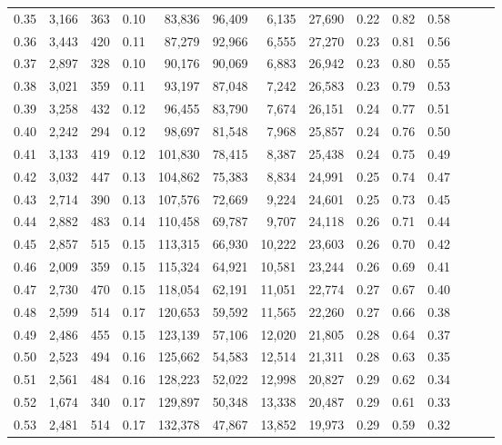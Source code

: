 \begin{tabular}{rrrrrrrrrrrrrr}
0.35 &  3,166 &    363 &  0.10 &   83,836 &   96,409 &   6,135 &  27,690 &  0.22 &  0.82 &      0.58 \\
0.36 &  3,443 &    420 &  0.11 &   87,279 &   92,966 &   6,555 &  27,270 &  0.23 &  0.81 &      0.56 \\
0.37 &  2,897 &    328 &  0.10 &   90,176 &   90,069 &   6,883 &  26,942 &  0.23 &  0.80 &      0.55 \\
0.38 &  3,021 &    359 &  0.11 &   93,197 &   87,048 &   7,242 &  26,583 &  0.23 &  0.79 &      0.53 \\
0.39 &  3,258 &    432 &  0.12 &   96,455 &   83,790 &   7,674 &  26,151 &  0.24 &  0.77 &      0.51 \\
0.40 &  2,242 &    294 &  0.12 &   98,697 &   81,548 &   7,968 &  25,857 &  0.24 &  0.76 &      0.50 \\
0.41 &  3,133 &    419 &  0.12 &  101,830 &   78,415 &   8,387 &  25,438 &  0.24 &  0.75 &      0.49 \\
0.42 &  3,032 &    447 &  0.13 &  104,862 &   75,383 &   8,834 &  24,991 &  0.25 &  0.74 &      0.47 \\
0.43 &  2,714 &    390 &  0.13 &  107,576 &   72,669 &   9,224 &  24,601 &  0.25 &  0.73 &      0.45 \\
0.44 &  2,882 &    483 &  0.14 &  110,458 &   69,787 &   9,707 &  24,118 &  0.26 &  0.71 &      0.44 \\
0.45 &  2,857 &    515 &  0.15 &  113,315 &   66,930 &  10,222 &  23,603 &  0.26 &  0.70 &      0.42 \\
0.46 &  2,009 &    359 &  0.15 &  115,324 &   64,921 &  10,581 &  23,244 &  0.26 &  0.69 &      0.41 \\
0.47 &  2,730 &    470 &  0.15 &  118,054 &   62,191 &  11,051 &  22,774 &  0.27 &  0.67 &      0.40 \\
0.48 &  2,599 &    514 &  0.17 &  120,653 &   59,592 &  11,565 &  22,260 &  0.27 &  0.66 &      0.38 \\
0.49 &  2,486 &    455 &  0.15 &  123,139 &   57,106 &  12,020 &  21,805 &  0.28 &  0.64 &      0.37 \\
0.50 &  2,523 &    494 &  0.16 &  125,662 &   54,583 &  12,514 &  21,311 &  0.28 &  0.63 &      0.35 \\
0.51 &  2,561 &    484 &  0.16 &  128,223 &   52,022 &  12,998 &  20,827 &  0.29 &  0.62 &      0.34 \\
0.52 &  1,674 &    340 &  0.17 &  129,897 &   50,348 &  13,338 &  20,487 &  0.29 &  0.61 &      0.33 \\
0.53 &  2,481 &    514 &  0.17 &  132,378 &   47,867 &  13,852 &  19,973 &  0.29 &  0.59 &      0.32 \\

\end{tabular}
